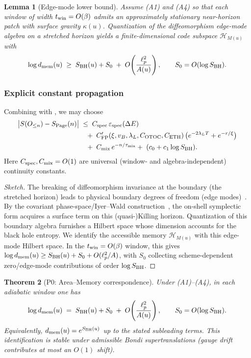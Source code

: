 \documentclass[aps,prd,preprint,onecolumn,superscriptaddress,nofootinbib,longbibliography,floatfix,11pt,showpacs,showkeys]{revtex4-2}
\theoremstyle{plain}
\newtheorem{theorem}{Theorem}
\newtheorem{lemma}[theorem]{Lemma}
\theoremstyle{definition}
\theoremstyle{remark}
\begin{document}
\label{sec:area-memory-evidence}
\begin{lemma}[Edge-mode lower bound]\label{lem:edge-lower}
Assume (A1) and (A4) so that each window of width $t_{\rm win}=O(\beta)$ admits an approximately stationary near-horizon patch with surface gravity $\kappa(u)$. Quantization of the diffeomorphism edge-mode algebra on a stretched horizon yields a finite-dimensional code subspace $\mathcal{H}_{M(u)}$ with
\[
\log d_{\rm mem}(u) \;\ge\; S_{\rm BH}(u) + S_0 \;+\; O\!\left(\frac{\ell_p^2}{A(u)}\right),
\qquad S_0=O(\log S_{\rm BH}).
\]
\end{lemma}

\subsubsection{Explicit constant propagation}
Combining  with , we may choose
\begin{equation}
\label{eq:budget-constants}
\begin{split}
\big|S(O_{\le n})-S_{\rm Page}(n)\big| 
&\;\le\; C_{\rm spec}\,\varepsilon_{\rm spec}(\Delta E) \\
&\quad+\; C'_{\mathrm{FP}}(\xi,v_B,\lambda_L,C_{\mathrm{OTOC}},C_{\mathrm{ETH}})\,
\big( e^{-2\lambda_L T} + e^{-r/\xi} \big) \\
&\quad+\; C_{\rm mix}\,e^{-n/\tau_{\rm mix}}
+\;(c_0+c_1\log S_{\rm BH}).
\end{split}
\end{equation}
Here $C_{\rm spec},C_{\rm mix}=O(1)$ are universal (window- and algebra-independent) continuity constants.
\begin{proof}[Sketch]
The breaking of diffeomorphism invariance at the boundary (the stretched horizon) leads to physical boundary degrees of freedom (edge modes)~\cite{Carlip:1995,DonnellyFreidel:2016}. By the covariant phase-space/Iyer--Wald construction~\cite{IyerWald:1994}, the on-shell symplectic form acquires a surface term on this (quasi-)Killing horizon. Quantization of this boundary algebra furnishes a Hilbert space whose dimension accounts for the black hole entropy. We identify the accessible memory $\mathcal{H}_{M(u)}$ with this edge-mode Hilbert space. In the $t_{\rm win}=O(\beta)$ window, this gives $\log d_{\rm mem}(u)\ge S_{\rm BH}(u)+S_0+O(\ell_p^2/A)$, with $S_0$ collecting scheme-dependent zero/edge-mode contributions of order $\log S_{\rm BH}$.
\end{proof}\begin{theorem}[P0: Area--Memory correspondence]\label{thm:P0}\label{app:area-memory}
Under (A1)--(A4), in each adiabatic window one has
\[
\log d_{\rm mem}(u) \;=\; S_{\rm BH}(u) + S_0 \;+\; O\!\left(\frac{\ell_p^2}{A(u)}\right),
\qquad S_0 = O(\log S_{\rm BH}) .
\]
Equivalently, $d_{\rm mem}(u)=e^{S_{\rm BH}(u)}$ up to the stated subleading terms. This identification is stable under admissible Bondi supertranslations (gauge drift contributes at most an $O(1)$ shift).
\end{theorem}
\end{document}
